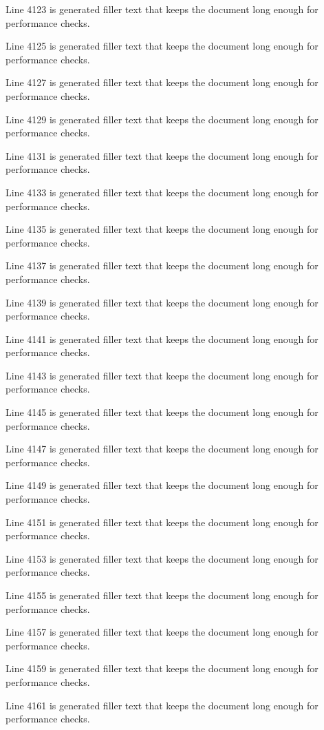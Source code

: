 Line 4123 is generated filler text that keeps the document long enough for performance checks.

Line 4125 is generated filler text that keeps the document long enough for performance checks.

Line 4127 is generated filler text that keeps the document long enough for performance checks.

Line 4129 is generated filler text that keeps the document long enough for performance checks.

Line 4131 is generated filler text that keeps the document long enough for performance checks.

Line 4133 is generated filler text that keeps the document long enough for performance checks.

Line 4135 is generated filler text that keeps the document long enough for performance checks.

Line 4137 is generated filler text that keeps the document long enough for performance checks.

Line 4139 is generated filler text that keeps the document long enough for performance checks.

Line 4141 is generated filler text that keeps the document long enough for performance checks.

Line 4143 is generated filler text that keeps the document long enough for performance checks.

Line 4145 is generated filler text that keeps the document long enough for performance checks.

Line 4147 is generated filler text that keeps the document long enough for performance checks.

Line 4149 is generated filler text that keeps the document long enough for performance checks.

Line 4151 is generated filler text that keeps the document long enough for performance checks.

Line 4153 is generated filler text that keeps the document long enough for performance checks.

Line 4155 is generated filler text that keeps the document long enough for performance checks.

Line 4157 is generated filler text that keeps the document long enough for performance checks.

Line 4159 is generated filler text that keeps the document long enough for performance checks.

Line 4161 is generated filler text that keeps the document long enough for performance checks.

